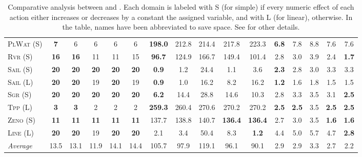 \documentclass[11pt,landscape]{article}
\begin{document}
\begin{table*}[tb]
{\begin{tabular}{|l||ccccc||ccccc||ccccc||}
\textsc{PlWat} (S)&\textbf{7}&6&6&6&6&\textbf{198.0}&212.8&214.4&217.8&223.3&\textbf{6.8}&7.8&8.8&7.6&7.6\\
\textsc{Rvr} (S)&\textbf{16}&\textbf{16}&11&11&15&\textbf{96.7}&124.9&166.7&149.4&101.4&2.8&3.0&3.9&2.4&\textbf{1.7}\\
\textsc{Sail} (S)&\textbf{20}&\textbf{20}&\textbf{20}&\textbf{20}&\textbf{20}&\textbf{0.9}&1.2&24.4&1.1&3.6&\textbf{2.3}&2.8&3.0&3.3&3.3\\
\textsc{Sail} (L)&\textbf{20}&\textbf{20}&19&\textbf{20}&19&\textbf{0.9}&1.0&16.2&8.2&16.2&\textbf{1.2}&1.6&1.8&1.5&1.5\\
\textsc{Sgr} (S)&\textbf{20}&\textbf{20}&\textbf{20}&\textbf{20}&\textbf{20}&\textbf{6.2}&14.4&28.8&14.6&10.3&2.8&3.3&3.5&3.1&\textbf{2.5}\\
\textsc{Tpp} (L)&\textbf{3}&\textbf{3}&2&2&2&\textbf{259.3}&260.4&270.6&270.2&270.2&\textbf{2.5}&\textbf{2.5}&3.5&\textbf{2.5}&\textbf{2.5}\\
\textsc{Zeno} (S)&\textbf{11}&\textbf{11}&\textbf{11}&\textbf{11}&\textbf{11}&137.7&138.8&140.7&\textbf{136.4}&\textbf{136.4}&2.7&3.0&3.5&\textbf{1.6}&\textbf{1.6}\\
\textsc{Line} (L)&\textbf{20}&\textbf{20}&19&\textbf{20}&\textbf{20}&2.1&3.4&50.4&8.3&\textbf{1.2}&4.4&5.0&5.7&4.7&\textbf{2.8}
\\\hline
\textit{Average}&13.5&13.1&11.9&14.1&14.4&105.7&97.9&119.1&96.1&90.1&2.9&2.9&3.3&2.7&2.2\\\hline

        \end{tabular}}
        \caption{Comparative analysis between  \pattya and \pattye. Each domain is labeled with S (for simple) if every numeric effect of each action either increases or decreases by a constant the assigned variable, and with L (for linear), otherwise. In the table, names have been abbreviated to save space.  See \cite{ipc2023} for other details.}
        \label{tab:exp-patty-a-patty-e}
        \end{table*}
        
\end{document}
